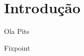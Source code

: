 \chapter{Introdução}\label{chp:intro}
Ola Pits \cite{Pitts2013}

\begin{coqcode}
	Fixpoint
\end{coqcode}